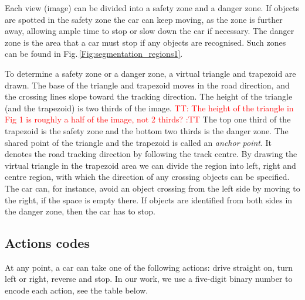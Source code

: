 \documentclass{svproc}
\renewcommand{\tt}[1]{\textcolor{red} {TT: #1 :TT} }
\begin{document}
Each view (image) can be divided into a safety zone and a danger zone. If objects are spotted in the safety zone the car can keep moving, as the zone is further away, allowing ample time to stop or slow down the car if necessary. The danger zone is the area that a car must stop if any objects are recognised. Such zones can be found in Fig.\,\ref{Fig:segmentation_regions1}. 

To determine a safety zone or a danger zone, a virtual triangle and trapezoid are drawn. The base of the triangle and trapezoid moves in the road direction, and the crossing lines slope toward the tracking direction. The height of the triangle (and the trapezoid) is two thirds of the image. \tt{The height of the triangle in Fig 1 is roughly a half of the image, not 2 thirds?} The top one third of the trapezoid is the safety zone and the bottom two thirds is the danger zone. The shared point of the triangle and the trapezoid is called an \emph{anchor point}. It denotes the road tracking direction by following the track centre. By drawing the virtual triangle in the trapezoid area we can divide the region into left, right and centre region, with which the direction of any crossing objects can be specified. The car can, for instance, avoid an object crossing from the left side by moving to the right, if the space is empty there. If objects are identified from both sides in the danger zone, then the car has to stop.  


\subsection{Actions codes} \label{sec:action}
At any point, a car can take one of the following actions: drive straight on, turn left or right, reverse and stop. In our work, we use a five-digit binary number to encode each action, see the table below. %

\end{document}
